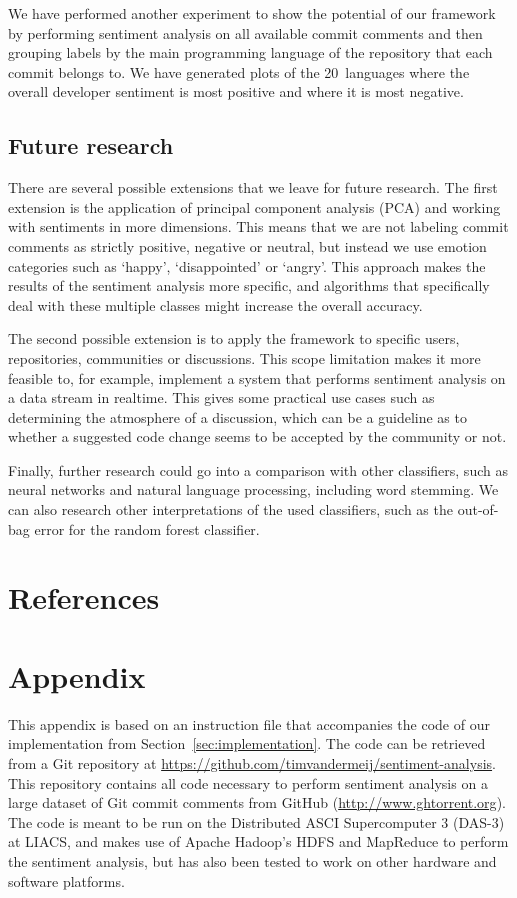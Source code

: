 \documentclass{article}
\begin{document}
We have performed another experiment to show the potential of our framework by
performing sentiment analysis on all available commit comments and then grouping
labels by the main programming language of the repository that each commit
belongs to. We have generated plots of the 20~languages where the overall
developer sentiment is most positive and where it is most negative.

\subsection{Future research}\label{sec:future-research}
There are several possible extensions that we leave for future research. The
first extension is the application of principal component analysis (PCA) and
working with sentiments in more dimensions. This means that we are not labeling
commit comments as strictly positive, negative or neutral, but instead we use
emotion categories such as `happy', `disappointed' or `angry'. This approach
makes the results of the sentiment analysis more specific, and algorithms that 
specifically deal with these multiple classes might increase the overall 
accuracy.

The second possible extension is to apply the framework to specific users,
repositories, communities or discussions. This scope limitation makes it
more feasible to, for example, implement a system that performs sentiment
analysis on a data stream in realtime. This gives some practical use cases such 
as determining the atmosphere of a discussion, which can be a guideline as to 
whether a suggested code change seems to be accepted by the community or not.

Finally, further research could go into a comparison with other classifiers,
such as neural networks and natural language processing, including word 
stemming. We can also research other interpretations of the used classifiers, 
such as the out-of-bag error for the random forest classifier.

\section*{References}\label{sec:references}
\printbibliography[heading=none]

\newpage

\appendix
\section{Appendix}\label{app:appendix}
This appendix is based on an instruction file that accompanies the 
code of our implementation from Section~\ref{sec:implementation}. The code can 
be retrieved from a Git repository at 
\url{https://github.com/timvandermeij/sentiment-analysis}. This repository 
contains all code necessary to perform sentiment analysis on a large dataset of 
Git commit comments from GitHub (\url{http://www.ghtorrent.org}). The code is 
meant to be run on the Distributed ASCI Supercomputer 3 (DAS-3) at LIACS, and 
makes use of Apache Hadoop's HDFS and MapReduce to perform the sentiment 
analysis, but has also been tested to work on other hardware and software 
platforms.
\end{document}
